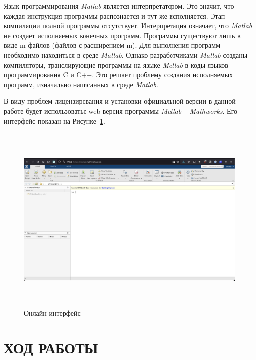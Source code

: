 \documentclass[a4paper,hidelinks,14pt]{extarticle}
\begin{document}
Язык программирования \textit{Matlab} является интерпретатором. Это значит, что каждая инструкция программы распознается и тут же исполняется. Этап компиляции полной программы отсутствует. Интерпретация означает, что \textit{Matlab} не создает исполняемых конечных программ. Программы существуют лишь в виде m-файлов (файлов с расширением m). Для выполнения программ необходимо находиться в среде \textit{Matlab}. Однако разработчиками \textit{Matlab} созданы компиляторы, транслирующие программы на языке \textit{Matlab} в коды языков программирования C и C++. Это решает проблему создания исполняемых программ, изначально написанных в среде \textit{Matlab}.

В виду проблем лицензирования и установки официальной версии в данной работе будет использоватьс web-версия программы \textit{Matlab} -- \textit{Mathworks}. Его интерфейс показан на Рисунке~\ref{fig:fig1}.

\begin{figure}[htbp]
	\centering
	\includegraphics[width=150mm,height=92mm]{fig/matlab.png}
	\caption{Онлайн-интерфейс}
     \label{fig:fig1}
\end{figure}


\section{ХОД РАБОТЫ}
\end{document}
